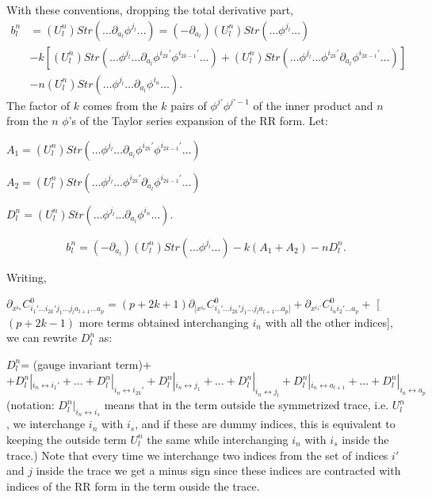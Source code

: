 \documentclass[a4paper,12pt]{article}
\begin{document}
  
With these conventions, dropping the total derivative part,
\begin{equation}
\begin{split}
b^n_l
&= (U^n_l) Str\left(\ldots \partial_{a_l}\phi^{j_l}\ldots \right)= (-\partial_{a_l})(U^n_l)Str\left(\ldots \phi^{j_l}\ldots \right)  \\
&- k\left[(U^n_l) Str\left(\ldots \phi^{j_l}\ldots \partial_{a_l}\phi^{i_{2k}'}\phi^{i_{2k-1}'}\ldots \right)+(U^n_l)Str\left(\ldots \phi^{j_l}\ldots \phi^{i_{2k}'}\partial_{a_l}\phi^{i_{2k-1}'}\ldots \right)  \right] \\
& - n (U^n_l)  Str\left(\ldots \phi^{j_l}\ldots \partial_{a_l}\phi^{i_n}\ldots \right).
\end{split}
\end{equation}
The factor of $k$ comes from the $k$ pairs of $\phi^{j'}\phi^{j'-1}$ of the inner product and $n$ from the $n$ $\phi$'s of the Taylor series expansion of the RR form. 
Let:
\begin{center}

$A_1  =  (U^n_l) Str\left(\ldots \phi^{j_l}\ldots \partial_{a_l}\phi^{i_{2k}'}\phi^{i_{2k-1}'}\ldots \right) $ 

$A_2  =  (U^n_l) Str\left(\ldots \phi^{j_l}\ldots \phi^{i_{2k}'}\partial_{a_l}\phi^{i_{2k-1}'}\ldots \right) $ 

$D^n_l     =  (U^n_l) Str\left(\ldots \phi^{j_l}\ldots \partial_{a_l}\phi^{i_n}\ldots \right)$.
\end{center}


\begin{equation}
b^n_l=(-\partial_{a_l})(U^n_l)Str\left(\ldots \phi^{j_l}\ldots \right)-k(A_1+A_2)-nD^n_l.
\end{equation}


Writing,

$\partial_{x^{i_n}}C^0_{i_1'\ldots i_{2k}'j_1\ldots j_la_{l+1}\ldots a_p}=(p+2k+1)\partial_{[x^{i_n}}C^0_{i_1'\ldots i_{2k}'j_1\ldots j_la_{l+1}\ldots a_p]}+\partial_{x^{i_1'}}C^0_{i_ni_2'\ldots a_p}+$ [$(p+2k-1)$ more terms obtained interchanging $i_n$ with all the other indices], \newline
we can rewrite $D^n_l$ as:

$D^n_l$= (gauge invariant term)+
\begin{equation}
    + D^n_l|_{i_n\leftrightarrow i_1'}+\ldots +D^n_l|_{i_n\leftrightarrow i_{2k}'}+D^n_l|_{i_n\leftrightarrow j_1}+\ldots +D^n_l|_{i_n\leftrightarrow j_l}+D^n_l|_{i_n\leftrightarrow a_{l+1}}+\ldots +D^n_l|_{i_n\leftrightarrow a_p}
\end{equation}
(notation: $D^n_l|_{i_n\leftrightarrow i_s}$ means  that in the term  outside the symmetrized trace, i.e. $U^n_l$,  we interchange $i_n$ with $i_{s}$, and if these are dummy indices, this is equivalent to keeping the outside term $U^n_l$ the same while interchanging $i_n$ with $i_s$ inside the trace.) Note that  every time we interchange two indices from the set of indices $i'$ and $j$ inside the trace we get a minus sign since these indices are contracted with indices of the RR form in the term ouside the trace.
\end{document}
